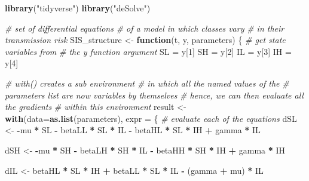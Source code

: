 \documentclass[
]{book}
\newenvironment{Shaded}{\begin{snugshade}}{\end{snugshade}}
\newcommand{\AttributeTok}[1]{\textcolor[rgb]{0.13,0.29,0.53}{#1}}
\newcommand{\CommentTok}[1]{\textcolor[rgb]{0.56,0.35,0.01}{\textit{#1}}}
\newcommand{\ControlFlowTok}[1]{\textcolor[rgb]{0.13,0.29,0.53}{\textbf{#1}}}
\newcommand{\DecValTok}[1]{\textcolor[rgb]{0.00,0.00,0.81}{#1}}
\newcommand{\FunctionTok}[1]{\textcolor[rgb]{0.13,0.29,0.53}{\textbf{#1}}}
\newcommand{\NormalTok}[1]{#1}
\newcommand{\OtherTok}[1]{\textcolor[rgb]{0.56,0.35,0.01}{#1}}
\newcommand{\SpecialCharTok}[1]{\textcolor[rgb]{0.81,0.36,0.00}{\textbf{#1}}}
\newcommand{\StringTok}[1]{\textcolor[rgb]{0.31,0.60,0.02}{#1}}
\theoremstyle{definition}
\theoremstyle{definition}
\theoremstyle{definition}
\theoremstyle{definition}
\theoremstyle{remark}
\begin{document}
\begin{Shaded}
\begin{Highlighting}[]
\FunctionTok{library}\NormalTok{(}\StringTok{"tidyverse"}\NormalTok{)}
\FunctionTok{library}\NormalTok{(}\StringTok{"deSolve"}\NormalTok{)}

\CommentTok{\# set of differential equations }
\CommentTok{\# of a model in which classes vary}
\CommentTok{\# in their transmission risk}
\NormalTok{SIS\_structure }\OtherTok{\textless{}{-}} \ControlFlowTok{function}\NormalTok{(t, y, parameters)}
\NormalTok{\{}
    \CommentTok{\# get state variables from}
    \CommentTok{\# the y function argument}
\NormalTok{    SL }\OtherTok{=}\NormalTok{ y[}\DecValTok{1}\NormalTok{]}
\NormalTok{    SH }\OtherTok{=}\NormalTok{ y[}\DecValTok{2}\NormalTok{]}
\NormalTok{    IL }\OtherTok{=}\NormalTok{ y[}\DecValTok{3}\NormalTok{]}
\NormalTok{    IH }\OtherTok{=}\NormalTok{ y[}\DecValTok{4}\NormalTok{]}
    
    \CommentTok{\# with() creates a \textquotesingle{}sub environment\textquotesingle{}}
    \CommentTok{\# in which all the named values of the }
    \CommentTok{\# parameters list are now variables by themselves}
    \CommentTok{\# hence, we can then evaluate all the gradients}
    \CommentTok{\# within this environment}
\NormalTok{    result }\OtherTok{\textless{}{-}} \FunctionTok{with}\NormalTok{(}\AttributeTok{data=}\FunctionTok{as.list}\NormalTok{(parameters),}
    \AttributeTok{expr =}\NormalTok{ \{}
        \CommentTok{\# evaluate each of the equations}
\NormalTok{        dSL }\OtherTok{\textless{}{-}} \SpecialCharTok{{-}}\NormalTok{mu }\SpecialCharTok{*}\NormalTok{ SL }\SpecialCharTok{{-}}\NormalTok{ betaLL }\SpecialCharTok{*}\NormalTok{ SL }\SpecialCharTok{*}\NormalTok{ IL }\SpecialCharTok{{-}}\NormalTok{ betaHL }\SpecialCharTok{*}\NormalTok{ SL }\SpecialCharTok{*}\NormalTok{ IH }\SpecialCharTok{+}\NormalTok{ gamma }\SpecialCharTok{*}\NormalTok{ IL}
        
\NormalTok{        dSH }\OtherTok{\textless{}{-}} \SpecialCharTok{{-}}\NormalTok{mu }\SpecialCharTok{*}\NormalTok{ SH }\SpecialCharTok{{-}}\NormalTok{ betaLH }\SpecialCharTok{*}\NormalTok{ SH }\SpecialCharTok{*}\NormalTok{ IL }\SpecialCharTok{{-}}\NormalTok{ betaHH }\SpecialCharTok{*}\NormalTok{ SH }\SpecialCharTok{*}\NormalTok{ IH }\SpecialCharTok{+}\NormalTok{ gamma }\SpecialCharTok{*}\NormalTok{ IH}
        
\NormalTok{        dIL }\OtherTok{\textless{}{-}}\NormalTok{ betaHL }\SpecialCharTok{*}\NormalTok{ SL }\SpecialCharTok{*}\NormalTok{ IH }\SpecialCharTok{+}\NormalTok{ betaLL }\SpecialCharTok{*}\NormalTok{ SL }\SpecialCharTok{*}\NormalTok{ IL }\SpecialCharTok{{-}}\NormalTok{ (gamma  }\SpecialCharTok{+}\NormalTok{ mu) }\SpecialCharTok{*}\NormalTok{ IL}
        

\end{Highlighting}
\end{Shaded}
\end{document}
